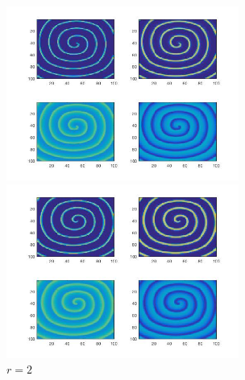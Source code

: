 \documentclass[
bachelor,
nofont, %
pdflinks,
]{xjtuthesis}
\begin{document}
\begin{figure}[!ht]
\begin{minipage}[!ht]{0.5\linewidth}
\centering
\includegraphics[width=3.0in]{p10r1_1.jpg}
\caption{$r=1$}
\end{minipage}%
\begin{minipage}[!ht]{0.5\linewidth}
\centering
\includegraphics[width=3.0in]{p10r2_1.jpg}
\caption{$r=2$}
\end{minipage}
\end{figure}
\end{document}

